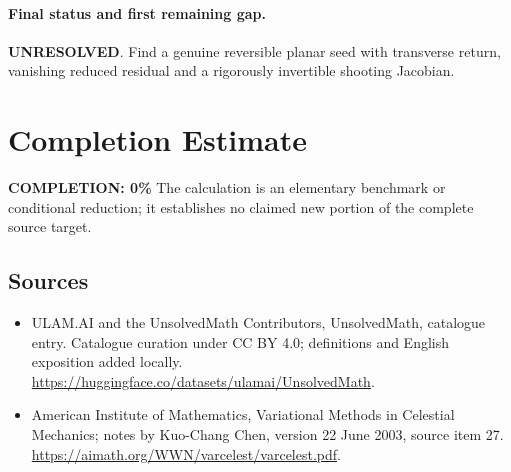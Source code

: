 \documentclass[11pt]{article}
\begin{document}
\paragraph{Final status and first remaining gap.}
\textbf{UNRESOLVED}. Find a genuine reversible planar seed with transverse return, vanishing reduced residual and a rigorously invertible shooting Jacobian.

\section{Completion Estimate}
\noindent\textbf{COMPLETION: 0\%}
The calculation is an elementary benchmark or conditional reduction; it establishes no claimed new portion of the complete source target.

\subsection{Sources}
\begin{itemize}
\item[\hypertarget{source:statement:1}{S1}] ULAM.AI and the UnsolvedMath Contributors, UnsolvedMath, catalogue entry. Catalogue curation under CC BY 4.0; definitions and English exposition added locally.
\url{https://huggingface.co/datasets/ulamai/UnsolvedMath}.
\item[\hypertarget{source:statement:2}{S2}] American Institute of Mathematics, Variational Methods in Celestial Mechanics; notes by Kuo-Chang Chen, version 22 June 2003, source item 27.
\url{https://aimath.org/WWN/varcelest/varcelest.pdf}.
\end{itemize}
\label{end:statement}
\end{document}
